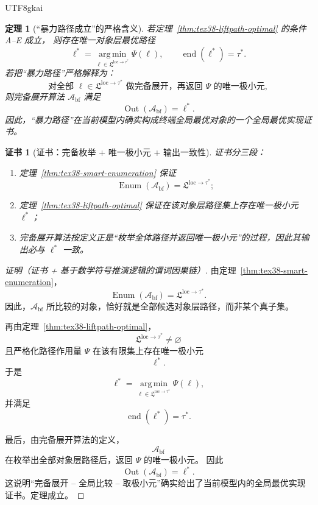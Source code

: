 \documentclass[12pt]{article}
\newtheorem{theorem}{定理}[section]
\newtheorem{Certificate}{证书}[section]
\begin{document}
\begin{CJK*}{UTF8}{gkai}
\begin{theorem}[“暴力路径成立”的严格含义]
\label{thm:tex38-smart-bruteforce}
若定理~\ref{thm:tex38-liftpath-optimal} 的条件 A--E 成立，
则存在唯一对象层最优路径
\[
  \ell^\ast
  =
  \operatorname*{arg\,min}_{\ell\in\mathfrak L^{\mathrm{loc}\to\tau^\ast}}
  \Psi(\ell),
  \qquad
  \operatorname{end}(\ell^\ast)=\tau^\ast.
\]
若把“暴力路径”严格解释为：
\[
  \text{对全部 }\ell\in\mathfrak L^{\mathrm{loc}\to\tau^\ast}\text{ 做完备展开，再返回 }\Psi\text{ 的唯一极小元},
\]
则完备展开算法 $\mathcal A_{\mathrm{bf}}$ 满足
\[
  \operatorname{Out}(\mathcal A_{\mathrm{bf}})=\ell^\ast.
\]
因此，“暴力路径”在当前模型内确实构成终端全局最优对象的一个全局最优实现证书。
\end{theorem}

\begin{Certificate}[证书：完备枚举 + 唯一极小元 + 输出一致性]
\label{cert:tex38-smart-bruteforce}
证书分三段：
\begin{enumerate}
  \item 定理~\ref{thm:tex38-smart-enumeration} 保证
  \[
    \operatorname{Enum}(\mathcal A_{\mathrm{bf}})
    =
    \mathfrak L^{\mathrm{loc}\to\tau^\ast};
  \]
  \item 定理~\ref{thm:tex38-liftpath-optimal} 保证在该对象层路径集上存在唯一极小元 $\ell^\ast$；
  \item 完备展开算法按定义正是“枚举全体路径并返回唯一极小元”的过程，因此其输出必与 $\ell^\ast$ 一致。
\end{enumerate}
\end{Certificate}

\begin{proof}[证明（证书 + 基于数学符号推演逻辑的谓词因果链）]
由定理~\ref{thm:tex38-smart-enumeration}，
\[
  \operatorname{Enum}(\mathcal A_{\mathrm{bf}})
  =
  \mathfrak L^{\mathrm{loc}\to\tau^\ast}.
\]
因此，$\mathcal A_{\mathrm{bf}}$ 所比较的对象，恰好就是全部候选对象层路径，而非某个真子集。

再由定理~\ref{thm:tex38-liftpath-optimal}，
\[
  \mathfrak L^{\mathrm{loc}\to\tau^\ast}\neq\varnothing
\]
且严格化路径作用量 $\Psi$ 在该有限集上存在唯一极小元
\[
  \ell^\ast.
\]
于是
\[
  \ell^\ast
  =
  \operatorname*{arg\,min}_{\ell\in\mathfrak L^{\mathrm{loc}\to\tau^\ast}}
  \Psi(\ell),
\]
并满足
\[
  \operatorname{end}(\ell^\ast)=\tau^\ast.
\]

最后，由完备展开算法的定义，
\[
  \mathcal A_{\mathrm{bf}}
\]
在枚举出全部对象层路径后，返回 $\Psi$ 的唯一极小元。
因此
\[
  \operatorname{Out}(\mathcal A_{\mathrm{bf}})
  =
  \ell^\ast.
\]
这说明“完备展开 -- 全局比较 -- 取极小元”确实给出了当前模型内的全局最优实现证书。定理成立。
\end{proof}


\end{CJK*}
\end{document}
